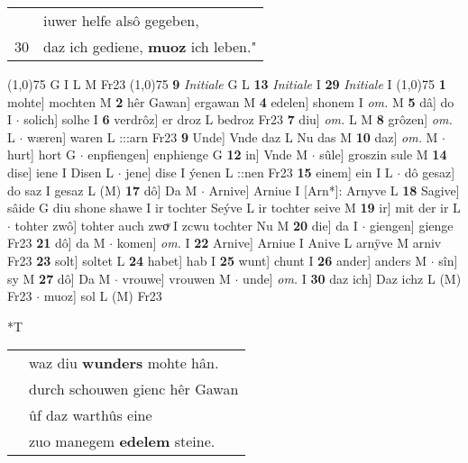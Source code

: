 \documentclass[8pt,a4paper,notitlepage]{article}
\begin{document}
\begin{table}[ht]
\begin{minipage}[t]{0.5\linewidth}
\begin{tabular}{rl}
 & iuwer helfe alsô gegeben,\\ 
30 & daz ich gediene, \textbf{muoz} ich leben."\\ 
\end{tabular}
\scriptsize
\line(1,0){75} \newline
G I L M Fr23 \newline
\line(1,0){75} \newline
\textbf{9} \textit{Initiale} G L  \textbf{13} \textit{Initiale} I  \textbf{29} \textit{Initiale} I  \newline
\line(1,0){75} \newline
\textbf{1} mohte] mochten M \textbf{2} hêr Gawan] ergawan M \textbf{4} edelen] shonem I \textit{om.} M \textbf{5} dâ] do I  $\cdot$ solich] solhe I \textbf{6} verdrôz] er droz L bedroz Fr23 \textbf{7} diu] \textit{om.} L M \textbf{8} grôzen] \textit{om.} L  $\cdot$ wæren] waren L :::arn Fr23 \textbf{9} Unde] Vnde daz L Nu das M \textbf{10} daz] \textit{om.} M  $\cdot$ hurt] hort G  $\cdot$ enpfiengen] enphienge G \textbf{12} in] Vnde M  $\cdot$ sûle] groszin sule M \textbf{14} dise] iene I Disen L  $\cdot$ jene] dise I ýenen L ::nen Fr23 \textbf{15} einem] ein I L  $\cdot$ dô gesaz] do saz I gesaz L (M) \textbf{17} dô] Da M  $\cdot$ Arnive] Arniue I [Arn*]: Arnyve L \textbf{18} Sagive] sâide G diu shone shawe I ir tochter Seýve L ir tochter seive M \textbf{19} ir] mit der ir L  $\cdot$ tohter zwô] tohter auch zwoͮ I zcwu tochter Nu M \textbf{20} die] da I  $\cdot$ giengen] gienge Fr23 \textbf{21} dô] da M  $\cdot$ komen] \textit{om.} I \textbf{22} Arnive] Arniue I Anive L arnÿve M arniv Fr23 \textbf{23} solt] soltet L \textbf{24} habet] hab I \textbf{25} wunt] chunt I \textbf{26} ander] anders M  $\cdot$ sîn] sy M \textbf{27} dô] Da M  $\cdot$ vrouwe] vrouwen M  $\cdot$ unde] \textit{om.} I \textbf{30} daz ich] Daz ichz L (M) Fr23  $\cdot$ muoz] sol L (M) Fr23 \newline
\end{minipage}
\hspace{0.5cm}
\begin{minipage}[t]{0.5\linewidth}
\small
\begin{center}*T
\end{center}
\begin{tabular}{rl}
 & waz diu \textbf{wunders} mohte hân.\\ 
 & durch schouwen gienc hêr Gawan\\ 
 & ûf daz warthûs eine\\ 
 & zuo manegem \textbf{edelem} steine.\\ 

\end{tabular}
\end{minipage}
\end{table}
\end{document}
